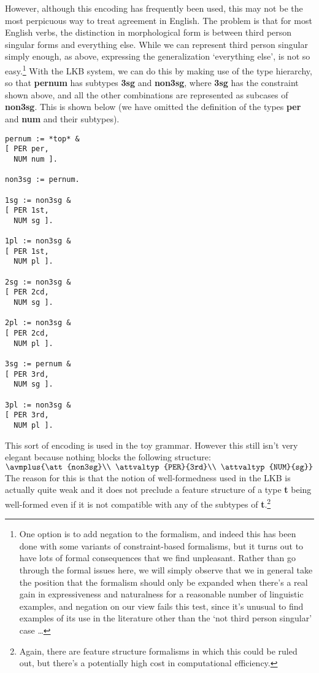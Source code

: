 \documentclass[12pt]{report}
\begin{document}
However, although this encoding has frequently been used, this may not be the
most perpicuous way to treat agreement in English.  The problem is that
for most English verbs, the distinction in morphological form is between
third person singular forms and everything else.  While we can represent
third person singular simply enough, as above, expressing the generalization
`everything else', is not so easy.\footnote{One option
is to add negation to the formalism, and indeed this has been done with some
variants of constraint-based formalisms, but it turns out to have lots
of formal consequences that we find unpleasant.  Rather than go through
the formal issues here, we will simply observe that we in general take the 
position that the formalism should only be expanded when there's a real
gain in expressiveness and naturalness for a reasonable
number of linguistic examples, and negation
on our view fails this test, since it's unusual to find examples of its use in
the literature other than the `not third person singular' case \ldots}
With the LKB system, we can do
this by making use of the type hierarchy, so that {\bf pernum}
has subtypes {\bf 3sg} and {\bf non3sg}, 
where {\bf 3sg} has the constraint shown above, and all the other
combinations are represented as subcases of {\bf non3sg}.  This is shown below
(we have omitted the definition of the types {\bf per} and {\bf num} and their
subtypes).
\begin{verbatim}
pernum := *top* &
[ PER per, 
  NUM num ].

non3sg := pernum.

1sg := non3sg &
[ PER 1st, 
  NUM sg ].

1pl := non3sg &
[ PER 1st, 
  NUM pl ].

2sg := non3sg &
[ PER 2cd, 
  NUM sg ].

2pl := non3sg &
[ PER 2cd, 
  NUM pl ].

3sg := pernum &
[ PER 3rd, 
  NUM sg ].

3pl := non3sg &
[ PER 3rd, 
  NUM pl ].

\end{verbatim}

This sort of encoding is used in the toy grammar.
However this still isn't very elegant because
nothing blocks the 
following structure:\\
{\tiny $\avmplus{\att{non3sg}\\ \attvaltyp{PER}{3rd}\\  \attvaltyp{NUM}{sg}}$}\\
The reason for this is that the notion of well-formedness used in the
LKB is actually quite weak and it does not preclude a feature structure
of a type {\bf t}
being well-formed even if it is not compatible with any of the subtypes
of {\bf t}.\footnote{Again, there are feature structure formalisms in which
this could be ruled out, but there's a potentially high cost in computational
efficiency.}
\end{document}
